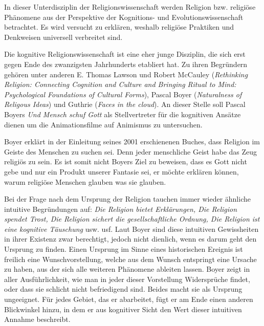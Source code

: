 In dieser Unterdisziplin der Religionswissenschaft werden Religion bzw. religiöse Phänomene aus der Perspektive der Kognitions- und Evolutionswissenschaft betrachtet. Es wird versucht zu erklären, weshalb religiöse Praktiken und Denkweisen universell verbreitet sind.

Die kognitive Religionswissenschaft ist eine eher junge Disziplin, die sich erst gegen Ende des zwanzigsten Jahrhunderts etabliert hat. Zu ihren Begründern gehören unter anderen E. Thomas Lawson und Robert McCauley (\emph{Rethinking Religion: Connecting Cognition and Culture and Bringing Ritual to Mind: Psychological Foundations of Cultural Forms}), Pascal Boyer (\emph{Naturalness of Religous Ideas}) und Guthrie (\emph{Faces in the cloud}). An dieser Stelle soll Pascal Boyers \emph{Und Mensch schuf Gott} als Stellvertreter für die kognitiven Ansätze dienen um die Animationsfilme auf Animismus zu untersuchen.

Boyer erklärt in der Einleitung seines 2001 erschienenen Buches, dass Religion im Geiste des Menschen zu suchen sei. Denn jeder menschliche Geist habe das Zeug religiös zu sein. Es ist somit nicht Boyers Ziel zu beweisen, dass es Gott nicht gebe und nur ein Produkt unserer Fantasie sei, er möchte erklären können, warum religiöse Menschen glauben was sie glauben.

Bei der Frage nach dem Ursprung der Religion tauchen immer wieder ähnliche intuitive Begründungen auf: \emph{Die Religion bietet Erklärungen, Die Religion spendet Trost, Die Religion sichert die gesellschaftliche Ordnung, Die Religion ist eine kognitive Täuschung} usw. usf. Laut Boyer sind diese intuitiven Gewissheiten in ihrer Existenz zwar berechtigt, jedoch nicht dienlich, wenn es darum geht den Ursprung zu finden. Einen Ursprung im Sinne eines historischen Ereignis ist freilich eine Wunschvorstellung, welche aus dem Wunsch entspringt eine Ursache zu haben, aus der sich alle weiteren Phänomene ableiten lassen. Boyer zeigt in aller Ausführlichkeit, wie man in jeder dieser Vorstellung Widersprüche findet, oder dass sie schlicht nicht befriedigend sind. Beides macht sie als Ursprung ungeeignet. Für jedes Gebiet, das er abarbeitet, fügt er am Ende einen anderen Blickwinkel hinzu, in dem er aus kognitiver Sicht den Wert dieser intuitiven Annahme beschreibt.

